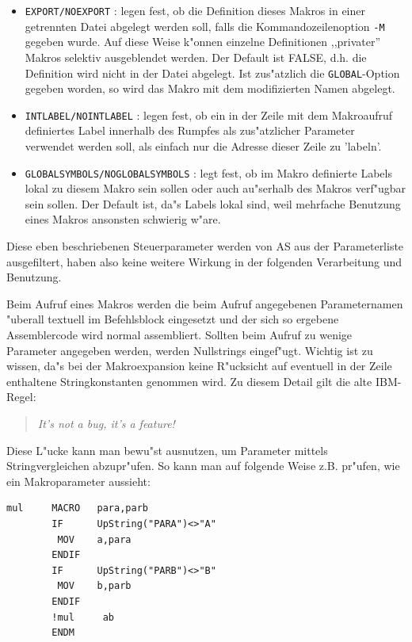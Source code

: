 \documentclass[12pt,a4paper,twoside]{report}
\newcommand{\ii}[1]{{\it #1}}
\newcommand{\tty}[1]{{\tt #1}}
\newcommand{\asname}{AS}
\begin{document}
\begin{itemize}
{      benutzt wird.  Das lokal bekannte Originalmakro wird von ihr
      nicht beeinflu"st.}
\item{\tty{EXPORT/NOEXPORT} : legen fest, ob die Definition dieses
      Makros in einer getrennten Datei abgelegt werden soll, falls
      die Kommandozeilenoption \tty{-M} gegeben wurde.  Auf diese
      Weise k"onnen einzelne Definitionen ,,privater'' Makros selektiv
      ausgeblendet werden.  Der Default ist FALSE, d.h. die Definition
      wird nicht in der Datei abgelegt.  Ist zus"atzlich die
      \tty{GLOBAL}-Option gegeben worden, so wird das Makro mit dem
      modifizierten Namen abgelegt.}
\item{\tty{INTLABEL/NOINTLABEL} : legen fest, ob ein in der Zeile mit
      dem Makroaufruf definiertes Label innerhalb des Rumpfes als
      zus"atzlicher Parameter verwendet werden soll, als einfach
      nur die Adresse dieser Zeile zu 'labeln'.}
\item{\tty{GLOBALSYMBOLS/NOGLOBALSYMBOLS} : legt fest, ob im
      Makro definierte Labels lokal zu diesem Makro sein sollen
      oder auch au"serhalb des Makros verf"ugbar sein sollen.
      Der Default ist, da"s Labels lokal sind, weil mehrfache
      Benutzung eines Makros ansonsten schwierig w"are.}
\end{itemize}
Diese eben beschriebenen Steuerparameter werden von \asname{} aus der
Parameterliste ausgefiltert, haben also keine weitere Wirkung in
der folgenden Verarbeitung und Benutzung.
\par
Beim Aufruf eines Makros werden die beim Aufruf angegebenen
Parameternamen "uberall textuell im Befehlsblock eingesetzt und der
sich so ergebene Assemblercode wird normal assembliert.  Sollten
beim Aufruf zu wenige Parameter angegeben werden, werden Nullstrings
eingef"ugt.  Wichtig ist zu wissen, da"s bei der Makroexpansion keine
R"ucksicht auf eventuell in der Zeile enthaltene Stringkonstanten
genommen wird.  Zu diesem Detail gilt die alte IBM-Regel:
\begin{quote}
\ii{It's not a bug, it's a feature!}
\end {quote}
Diese L"ucke kann man bewu"st ausnutzen, um Parameter mittels
Stringvergleichen abzupr"ufen.  So kann man auf folgende Weise
z.B. pr"ufen, wie ein Makroparameter aussieht:
\begin{verbatim}
mul     MACRO   para,parb
        IF      UpString("PARA")<>"A"
         MOV    a,para
        ENDIF
        IF      UpString("PARB")<>"B"
         MOV    b,parb
        ENDIF
        !mul     ab
        ENDM
\end{verbatim}
\end{document}
